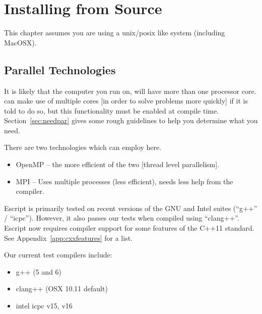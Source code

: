 %
%
%


\chapter{Installing from Source}\label{chap:source}

This chapter assumes you are using a unix/posix like system (including MacOSX).

\section{Parallel Technologies}\label{sec:par}
It is likely that the computer you run \escript on, will have more than one processor core.
\escript can make use of multiple cores [in order to solve problems more quickly] if it is told to do so,
but this functionality must be enabled at compile time.
Section~\ref{sec:needpar} gives some rough guidelines to help you determine what you need.

There are two technologies which \escript can employ here.
\begin{itemize}
 \item OpenMP -- the more efficient of the two [thread level parallelism].
 \item MPI -- Uses multiple processes (less efficient), needs less help from the compiler.
\end{itemize}

Escript is primarily tested on recent versions of the GNU and Intel suites (``g++'' / ``icpc'').
However, it also passes our tests when compiled using ``clang++''.
Escript now requires compiler support for some features of the C++11 standard.
See Appendix~\ref{app:cxxfeatures} for a list.


Our current test compilers include:
\begin{itemize}
 \item g++ (5 and 6)
 \item clang++ (OSX 10.11 default)
 \item intel icpc v15, v16
\end{itemize}

